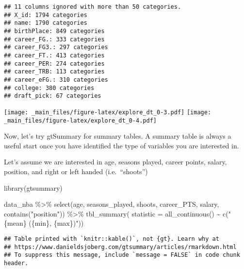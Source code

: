 \documentclass[
]{book}
\newenvironment{Shaded}{\begin{snugshade}}{\end{snugshade}}
\newcommand{\AttributeTok}[1]{\textcolor[rgb]{0.77,0.63,0.00}{#1}}
\newcommand{\AttributeTok}[1]{\textcolor[rgb]{0.13,0.29,0.53}{#1}}
\newcommand{\FunctionTok}[1]{\textcolor[rgb]{0.00,0.00,0.00}{#1}}
\newcommand{\FunctionTok}[1]{\textcolor[rgb]{0.13,0.29,0.53}{\textbf{#1}}}
\newcommand{\NormalTok}[1]{#1}
\newcommand{\SpecialCharTok}[1]{\textcolor[rgb]{0.00,0.00,0.00}{#1}}
\newcommand{\SpecialCharTok}[1]{\textcolor[rgb]{0.81,0.36,0.00}{\textbf{#1}}}
\newcommand{\StringTok}[1]{\textcolor[rgb]{0.31,0.60,0.02}{#1}}
\begin{document}
\begin{verbatim}
## 11 columns ignored with more than 50 categories.
## X_id: 1794 categories
## name: 1790 categories
## birthPlace: 849 categories
## career_FG.: 333 categories
## career_FG3.: 297 categories
## career_FT.: 413 categories
## career_PER: 274 categories
## career_TRB: 113 categories
## career_eFG.: 310 categories
## college: 380 categories
## draft_pick: 67 categories
\end{verbatim}

\texttt{[image: \_main\_files/figure-latex/explore\_dt\_0-3.pdf]} \texttt{[image: \_main\_files/figure-latex/explore\_dt\_0-4.pdf]}

Now, let's try gtSummary for summary tables. A summary table is always a useful start once you have identified the type of variables you are interested in.

Let's assume we are interested in age, seasons played, career points, salary,
position, and right or left handed (i.e.~``shoots'')

\begin{Shaded}
\begin{Highlighting}[]
\FunctionTok{library}\NormalTok{(gtsummary)}

\NormalTok{data\_nba }\SpecialCharTok{\%\textgreater{}\%} 
  \FunctionTok{select}\NormalTok{(age, seasons\_played, shoots, career\_PTS, salary, }\FunctionTok{contains}\NormalTok{(}\StringTok{"position"}\NormalTok{)) }\SpecialCharTok{\%\textgreater{}\%}
         \FunctionTok{tbl\_summary}\NormalTok{(}
           \AttributeTok{statistic =} \FunctionTok{all\_continuous}\NormalTok{() }\SpecialCharTok{\textasciitilde{}} \FunctionTok{c}\NormalTok{(}\StringTok{"\{mean\} (\{min\}, \{max\})"}\NormalTok{)) }
\end{Highlighting}
\end{Shaded}

\begin{verbatim}
## Table printed with `knitr::kable()`, not {gt}. Learn why at
## https://www.danieldsjoberg.com/gtsummary/articles/rmarkdown.html
## To suppress this message, include `message = FALSE` in code chunk header.
\end{verbatim}
\end{document}
